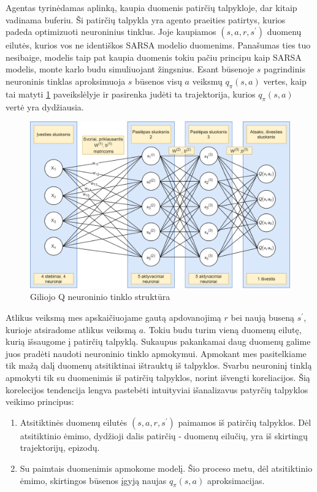 \documentclass[a4paper, 12pt]{article}
\begin{document}
Agentas tyrinėdamas aplinką, kaupia duomenis patirčių talpykloje, dar kitaip vadinama buferiu. Ši patirčių talpykla yra agento praeities patirtys, kurios padeda optimizuoti neuroninius tinklus. Joje kaupiamos $(s,a,r,s^\prime)$ duomenų eilutės, kurios vos ne identiškos SARSA modelio duomenims. Panašumas ties tuo nesibaige, modelis taip pat kaupia duomenis tokiu pačiu principu kaip SARSA modelis, monte karlo budu simuliuojant žingsnius. Esant būsenoje $s$ pagrindinis neuroninis tinklas aproksimuoja $s$ būsenos visų $a$ veiksmų $q_{\pi}(s, a)$ vertes, kaip tai matyti \ref{QNeuroniniaiTinklai} paveikslėlyje ir pasirenka judėti ta trajektorija, kurios $q_{\pi}(s, a)$ vertė yra dydžiausia. 

\begin{figure}[h]
\centering
\includegraphics[width=1\textwidth]{Q Neuronu diagrama}
\caption{Giliojo Q neuroninio tinklo struktūra}
\label{QNeuroniniaiTinklai}
\end{figure}


Atlikus veiksmą mes apskaičiuojame gautą apdovanojimą $r$ bei naują buseną $s^\prime$, kurioje atsiradome atlikus veiksmą $a$. Tokiu budu turim vieną duomenų eilutę, kurią išsaugome į patirčių talpyklą. Sukaupus pakankamai daug duomenų galime juos pradėti naudoti neuroninio tinklo apmokymui. Apmokant mes pasitelkiame tik mažą dalį duomenų atsitiktinai ištrauktų iš talpyklos. Svarbu neuroninį tinklą apmokyti tik su duomenimis iš patirčių talpyklos, norint išvengti koreliacijos. Šią korelecijos tendencija lengva pastebėti intuityviai išanalizavus patyrčių talpyklos veikimo principus:

\begin{enumerate}
  \addtolength{\itemsep}{-0.5\baselineskip} 
  \item Atsitiktinės duomenų eilutės $(s,a,r,s^\prime)$ paimamos iš patirčių talpyklos. Dėl atsitiktinio ėmimo, dydžioji dalis patirčių - duomenų eilučių, yra iš skirtingų trajektorijų, epizodų.
  \item Su paimtais duomenimis apmokome modelį. Šio proceso metu, dėl atsitiktinio ėmimo, skirtingos būsenos įgyją naujas $q_{\pi}(s, a)$ aproksimacijas. 
\end{enumerate}
\end{document}
